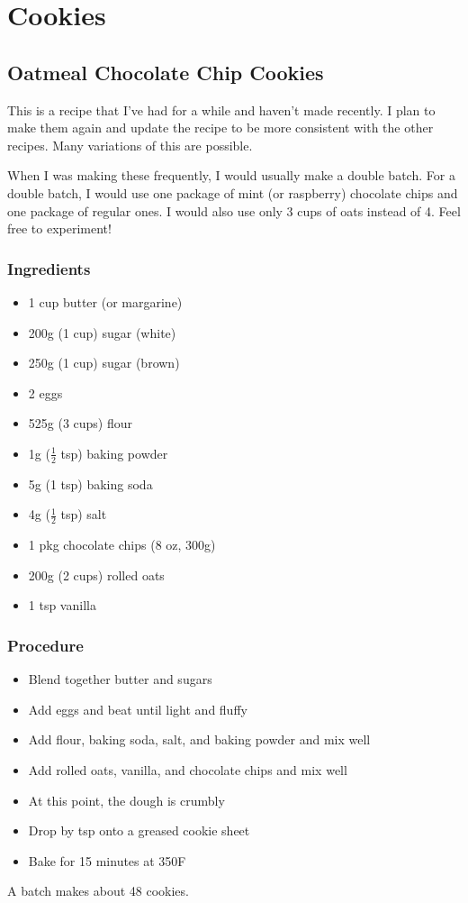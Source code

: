 \documentclass[10pt, openany]{book}
\begin{document}
\chapter{Cookies}
\section{Oatmeal Chocolate Chip Cookies}
This is a recipe that I've had for a while and haven't made recently.  I plan to make them again and update the recipe to be more consistent with the other recipes.  Many variations of this are possible.

When I was making these frequently, I would usually make a double batch.  For a double batch, I would use one package of mint (or raspberry) chocolate chips and one package of regular ones.  I would also use only 3 cups of oats instead of 4.  Feel free to experiment!
\subsection{Ingredients}
\begin{itemize}
  \item 1 cup butter (or margarine)
  \item 200g (1 cup) sugar (white)
  \item 250g (1 cup) sugar (brown)
  \item 2 eggs
  \item 525g (3 cups) flour
  \item 1g ($\frac{1}{2}$ tsp) baking powder
  \item 5g (1 tsp) baking soda
  \item 4g ($\frac{1}{2}$ tsp) salt
  \item 1 pkg chocolate chips (8 oz, 300g)
  \item 200g (2 cups) rolled oats
  \item 1 tsp vanilla
\end{itemize}
\subsection{Procedure}
\begin{itemize}
  \item Blend together butter and sugars
  \item Add eggs and beat until light and fluffy
  \item Add flour, baking soda, salt, and baking powder and mix well
  \item Add rolled oats, vanilla, and chocolate chips and mix well
  \item At this point, the dough is crumbly
  \item Drop by tsp onto a greased cookie sheet
  \item Bake for 15 minutes at 350\degree{}F
\end{itemize}
A batch makes about 48 cookies.
\end{document}
